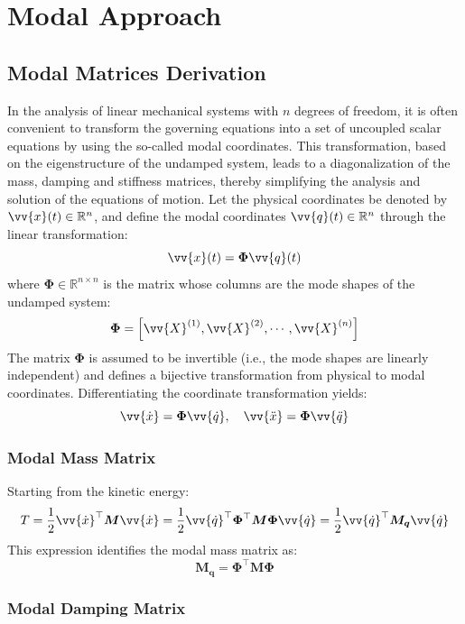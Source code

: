 
\chapter{Modal Approach}

\section{Modal Matrices Derivation}

In the analysis of linear mechanical systems with \( n \) degrees of freedom, it is often convenient to transform the governing equations into a set of uncoupled scalar equations by using the so-called modal coordinates. This transformation, based on the eigenstructure of the undamped system, leads to a diagonalization of the mass, damping and stiffness matrices, thereby simplifying the analysis and solution of the equations of motion. Let the physical coordinates be denoted by \( \vv{x}(t) \in \mathbb{R}^n \), and define the modal coordinates \( \vv{q}(t) \in \mathbb{R}^n \) through the linear transformation:
\[
\vv{x}(t) = \boldsymbol{\Phi} \vv{q}(t)
\]
where \( \boldsymbol{\Phi} \in \mathbb{R}^{n \times n} \) is the matrix whose columns are the mode shapes of the undamped system:
\[
\boldsymbol{\Phi} = \left[ \vv{X}^{(1)}, \vv{X}^{(2)}, \cdots, \vv{X}^{(n)} \right]
\]
The matrix \( \boldsymbol{\Phi} \) is assumed to be invertible (i.e., the mode shapes are linearly independent) and defines a bijective transformation from physical to modal coordinates. Differentiating the coordinate transformation yields:
\[
\vv{\dot{x}} = \boldsymbol{\Phi} \vv{\dot{q}}, \quad
\vv{\ddot{x}} = \boldsymbol{\Phi} \vv{\ddot{q}}
\]

\subsection{Modal Mass Matrix}

Starting from the kinetic energy:
\[
T = \frac{1}{2} \vv{\dot{x}}^\top \boldsymbol{M} \vv{\dot{x}} = \frac{1}{2} \vv{\dot{q}}^\top \boldsymbol{\Phi}^\top \boldsymbol{M} \boldsymbol{\Phi} \vv{\dot{q}} = \frac{1}{2} \vv{\dot{q}}^\top \boldsymbol{M_q} \vv{\dot{q}}
\]
This expression identifies the modal mass matrix as:
\[
\boldsymbol{M_q} = \boldsymbol{\Phi}^\top \boldsymbol{M} \boldsymbol{\Phi}
\]

\subsection{Modal Damping Matrix}

